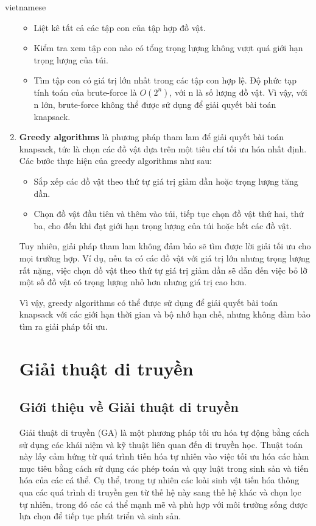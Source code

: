 \documentclass[a4paper]{article}
\begin{document}
\begin{otherlanguage*}{vietnamese}
\begin{enumerate}[leftmargin=7pt]
\begin{itemize}[leftmargin=7pt]
\item Liệt kê tất cả các tập con của tập hợp đồ vật.
\item Kiểm tra xem tập con nào có tổng trọng lượng không vượt quá giới hạn trọng lượng của túi.
\item Tìm tập con có giá trị lớn nhất trong các tập con hợp lệ.
Độ phức tạp tính toán của brute-force là $O(2^n)$, với n là số lượng đồ vật. Vì vậy, với n lớn, brute-force không thể được sử dụng để giải quyết bài toán knapsack.
\end{itemize}
\item \textbf{Greedy algorithms} là phương pháp tham lam để giải quyết bài toán knapsack, tức là chọn các đồ vật dựa trên một tiêu chí tối ưu hóa nhất định. Các bước thực hiện của greedy algorithms như sau:

\begin{itemize}[leftmargin=7pt]
\item Sắp xếp các đồ vật theo thứ tự giá trị giảm dần hoặc trọng lượng tăng dần.
\item Chọn đồ vật đầu tiên và thêm vào túi, tiếp tục chọn đồ vật thứ hai, thứ ba, cho đến khi đạt giới hạn trọng lượng của túi hoặc hết các đồ vật.    
\end{itemize}

Tuy nhiên, giải pháp tham lam không đảm bảo sẽ tìm được lời giải tối ưu cho mọi trường hợp. Ví dụ, nếu ta có các đồ vật với giá trị lớn nhưng trọng lượng rất nặng, việc chọn đồ vật theo thứ tự giá trị giảm dần sẽ dẫn đến việc bỏ lỡ một số đồ vật có trọng lượng nhỏ hơn nhưng giá trị cao hơn.

Vì vậy, greedy algorithms có thể được sử dụng để giải quyết bài toán knapsack với các giới hạn thời gian và bộ nhớ hạn chế, nhưng không đảm bảo tìm ra giải pháp tối ưu.

\section{Giải thuật di truyền} \label{sec:ga}
\subsection{Giới thiệu về Giải thuật di truyền}

Giải thuật di truyền (GA) là một phương pháp tối ưu hóa tự động bằng cách sử dụng các khái niệm và kỹ thuật liên quan đến di truyền học. Thuật toán này lấy cảm hứng từ quá trình tiến hóa tự nhiên vào việc tối ưu hóa các hàm mục tiêu bằng cách sử dụng các phép toán và quy luật trong sinh sản và tiến hóa của các cá thể. Cụ thể, trong tự nhiên các loài sinh vật tiến hóa thông qua các quá trình di truyền gen từ thế hệ này sang thế hệ khác và chọn lọc tự nhiên, trong đó các cá thể mạnh mẽ và phù hợp với môi trường sống được lựa chọn để tiếp tục phát triển và sinh sản.


\end{enumerate}
\end{otherlanguage*}
\end{document}
